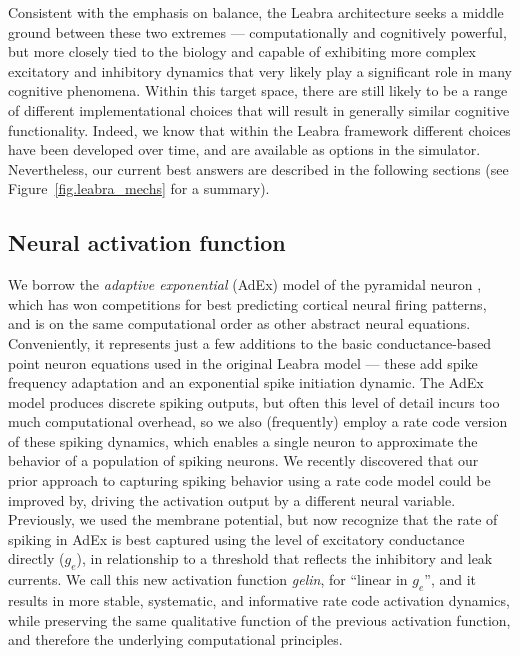 \documentclass[11pt,twoside]{article}
\begin{document}
Consistent with the emphasis on balance, the Leabra architecture seeks a
middle ground between these two extremes --- computationally and cognitively
powerful, but more closely tied to the biology and capable of exhibiting more
complex excitatory and inhibitory dynamics that very likely play a significant
role in many cognitive phenomena.  Within this target space, there are still
likely to be a range of different implementational choices that will result in
generally similar cognitive functionality.  Indeed, we know that within the
Leabra framework different choices have been developed over time, and are
available as options in the simulator.  Nevertheless, our current best answers
are described in the following sections (see Figure~\ref{fig.leabra_mechs} for
a summary).

\subsection{Neural activation function}

We borrow the {\em adaptive exponential} (AdEx) model of the pyramidal neuron
\cite{BretteGerstner05}, which has won competitions for best predicting
cortical neural firing patterns, and is on the same computational order as
other abstract neural equations.  Conveniently, it represents just a few
additions to the basic conductance-based point neuron equations used in the
original Leabra model --- these add spike frequency adaptation and an
exponential spike initiation dynamic.  The AdEx model produces discrete
spiking outputs, but often this level of detail incurs too much computational
overhead, so we also (frequently) employ a rate code version of these spiking
dynamics, which enables a single neuron to approximate the behavior of a
population of spiking neurons.  We recently discovered that our prior approach
to capturing spiking behavior using a rate code model could be improved by,
driving the activation output by a different neural variable.  Previously, we
used the membrane potential, but now recognize that the rate of spiking in
AdEx is best captured using the level of excitatory conductance directly
($g_e$), in relationship to a threshold that reflects the inhibitory and leak
currents.  We call this new activation function {\em gelin}, for ``linear in
$g_e$'', and it results in more stable, systematic, and informative rate code
activation dynamics, while preserving the same qualitative function of the
previous activation function, and therefore the underlying computational
principles.
\end{document}
